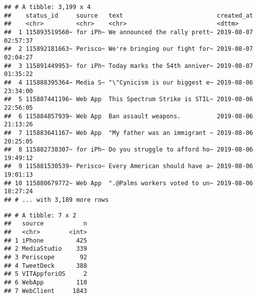 \documentclass[]{article}
\newenvironment{Shaded}{\begin{snugshade}}{\end{snugshade}}
\newcommand{\KeywordTok}[1]{\textcolor[rgb]{0.13,0.29,0.53}{\textbf{#1}}}
\newcommand{\NormalTok}[1]{#1}
\newcommand{\OperatorTok}[1]{\textcolor[rgb]{0.81,0.36,0.00}{\textbf{#1}}}
\newcommand{\StringTok}[1]{\textcolor[rgb]{0.31,0.60,0.02}{#1}}
\begin{document}
\begin{verbatim}
## # A tibble: 3,199 x 4
##    status_id     source   text                          created_at         
##    <chr>         <chr>    <chr>                         <dttm>             
##  1 115893519560~ for iPh~ We announced the rally prett~ 2019-08-07 02:57:37
##  2 115892181663~ Perisco~ We're bringing our fight for~ 2019-08-07 02:04:27
##  3 115891449953~ for iPh~ Today marks the 54th anniver~ 2019-08-07 01:35:22
##  4 115888395364~ Media S~ "\"Cynicism is our biggest e~ 2019-08-06 23:34:00
##  5 115887441196~ Web App  This Spectrum Strike is STIL~ 2019-08-06 22:56:05
##  6 115884857939~ Web App  Ban assault weapons.          2019-08-06 21:13:26
##  7 115883641167~ Web App  "My father was an immigrant ~ 2019-08-06 20:25:05
##  8 115882738307~ for iPh~ Do you struggle to afford ho~ 2019-08-06 19:49:12
##  9 115881530539~ Perisco~ Every American should have a~ 2019-08-06 19:01:13
## 10 115880679772~ Web App  ".@Palms workers voted to un~ 2019-08-06 18:27:24
## # ... with 3,189 more rows
\end{verbatim}

\begin{Shaded}
\end{Shaded}

\begin{verbatim}
## # A tibble: 7 x 2
##   source           n
##   <chr>        <int>
## 1 iPhone         425
## 2 MediaStudio    339
## 3 Periscope       92
## 4 TweetDeck      388
## 5 VITAppforiOS     2
## 6 WebApp         110
## 7 WebClient     1843
\end{verbatim}
\end{document}
